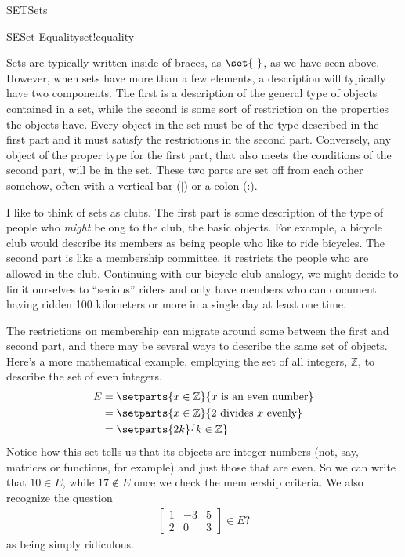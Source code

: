 \begin{subsect}{SET}{Sets}
\begin{definition}{SE}{Set Equality}{set!equality}
\end{definition}
%
\begin{para}Sets are typically written inside of braces, as $\set{\ }$, as we have seen above.  However, when sets have more than a few elements, a description will typically have two components.  The first is a description of the general type of objects contained in a set, while the second is some sort of restriction on the properties the objects have.  Every object in the set must be of the type described in the first part and it must satisfy the restrictions in the second part.  Conversely, any object of the proper type for the first part, that also meets the conditions of the second part, will be in the set.  These two parts are set off from each other somehow, often with a vertical bar ($\vert$) or a colon (:).\end{para}
%
\begin{para}I like to think of sets as clubs.  The first part is some description of the type of people who {\em might} belong to the club, the basic objects.  For example, a bicycle club would describe its members as being people who like to ride bicycles.  The second part is like a membership committee, it restricts the people who are allowed in the club.  Continuing with our bicycle club analogy, we might decide to limit ourselves to ``serious'' riders and only have members who can document having ridden 100 kilometers or more in a single day at least one time.\end{para}
%
\begin{para}The restrictions on membership can migrate around some between the first and second part, and there may be several ways to describe the same set of objects.  Here's a more mathematical example, employing the set of all integers, ${\mathbb Z}$, to describe the set of even integers.
%
\begin{align*}
E
&=\setparts{x\in{\mathbb Z}}{x\text{ is an even number}}\\
&=\setparts{x\in{\mathbb Z}}{2\text{ divides }x\text{ evenly}}\\
&=\setparts{2k}{k\in{\mathbb Z}}
\end{align*}
%
Notice how this set tells us that its objects are integer numbers (not, say, matrices or functions, for example) and just those that are even.  So we can write that $10\in E$, while $17\not\in E$ once we check the membership criteria.  We also recognize the question
%
\begin{align*}
\begin{bmatrix}
1&-3&5\\
2&0&3
\end{bmatrix}
\in E\text{?}
\end{align*}
%
as being simply ridiculous.\end{para}
%
\end{subsect}
